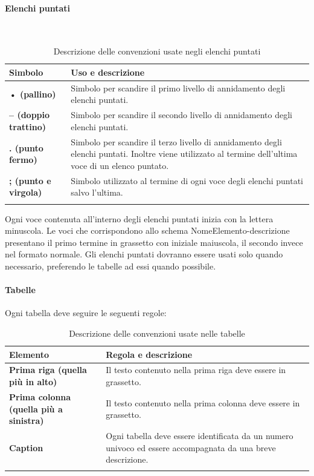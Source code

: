 {\paragraph*{Elenchi puntati}
\
{
	\setlength{\freewidth}{\dimexpr\textwidth-0\tabcolsep}
	\renewcommand{\arraystretch}{1.5}
	\setlength{\aboverulesep}{0pt}
	\setlength{\belowrulesep}{0pt}
	\begin{longtable}{L{.25\freewidth} L{.75\freewidth}}
		\textbf{Simbolo} & \textbf{Uso e descrizione} \\
		\toprule
		\endhead		
		\textbf{• (pallino)} & Simbolo per scandire il primo livello di annidamento degli elenchi puntati. \\ 
		\textbf{-- (doppio trattino)} & Simbolo per scandire il secondo livello di annidamento degli elenchi puntati.  \\
		\textbf{. (punto fermo)} & Simbolo per scandire il terzo livello di annidamento degli elenchi puntati. Inoltre viene utilizzato al termine dell'ultima voce di un elenco puntato. \\
		\textbf{; (punto e virgola)} & Simbolo utilizzato al termine di ogni voce degli elenchi puntati salvo l'ultima.\\
		\bottomrule
		\hiderowcolors
		\caption{Descrizione delle convenzioni usate negli elenchi puntati}
\end{longtable}
}
Ogni voce contenuta all'interno degli elenchi puntati inizia con la lettera minuscola. Le voci che corrispondono allo schema NomeElemento-descrizione presentano il primo termine in grassetto con iniziale maiuscola, il secondo invece nel formato normale.
Gli elenchi puntati dovranno essere usati solo quando necessario, preferendo le tabelle ad essi quando possibile.

\paragraph*{Tabelle}
Ogni tabella deve seguire le seguenti regole:
\
{
	\setlength{\freewidth}{\dimexpr\textwidth-0\tabcolsep}
	\renewcommand{\arraystretch}{1.5}
	\setlength{\aboverulesep}{0pt}
	\setlength{\belowrulesep}{0pt}
	\begin{longtable}{L{.25\freewidth} L{.75\freewidth}}
		\rowcolor{AzzurroGruppo!30}
		\textbf{Elemento} & \textbf{Regola e descrizione} \\
		\toprule
		\endhead		
		\textbf{Prima riga (quella più in alto)} & Il testo contenuto nella prima riga deve essere in grassetto. \\ 
		\textbf{Prima colonna (quella più a sinistra)} & Il testo contenuto nella prima colonna deve essere in grassetto.  \\
		\textbf{Caption} & Ogni tabella deve essere identificata da un numero univoco ed essere accompagnata da una breve descrizione. \\
		\bottomrule
		\hiderowcolors
		\caption{Descrizione delle convenzioni usate nelle tabelle}
\end{longtable}
}

}
